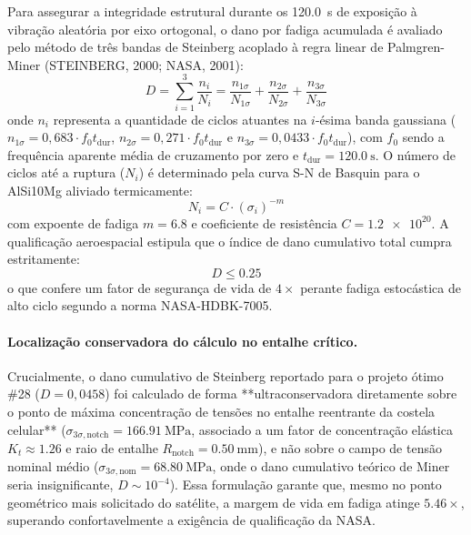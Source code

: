 Para assegurar a integridade estrutural durante os \SI{120.0}{\second} de exposição à vibração aleatória por eixo ortogonal, o dano por fadiga acumulada é avaliado pelo método de três bandas de Steinberg acoplado à regra linear de Palmgren-Miner (STEINBERG, 2000; NASA, 2001):
\begin{equation}
  D = \sum_{i=1}^{3} \frac{n_i}{N_i} = \frac{n_{1\sigma}}{N_{1\sigma}} + \frac{n_{2\sigma}}{N_{2\sigma}} + \frac{n_{3\sigma}}{N_{3\sigma}}
  \label{eq:miner}
\end{equation}
onde $n_i$ representa a quantidade de ciclos atuantes na $i$-ésima banda gaussiana ($n_{1\sigma} = 0{,}683 \cdot f_0 t_{\text{dur}}$, $n_{2\sigma} = 0{,}271 \cdot f_0 t_{\text{dur}}$ e $n_{3\sigma} = 0{,}0433 \cdot f_0 t_{\text{dur}}$), com $f_0$ sendo a frequência aparente média de cruzamento por zero e $t_{\text{dur}} = \SI{120.0}{\second}$. O número de ciclos até a ruptura ($N_i$) é determinado pela curva S-N de Basquin para o AlSi10Mg aliviado termicamente:
\begin{equation}
  N_i = C \cdot \left(\sigma_i\right)^{-m}
  \label{eq:basquin}
\end{equation}
com expoente de fadiga $m = \num{6.8}$ e coeficiente de resistência $C = \num{1.2e20}$. A qualificação aeroespacial estipula que o índice de dano cumulativo total cumpra estritamente:
\begin{equation}
  D \le \num{0.25}
  \label{eq:dmax}
\end{equation}
o que confere um fator de segurança de vida de $4\times$ perante fadiga estocástica de alto ciclo segundo a norma NASA-HDBK-7005.

\paragraph*{Localização conservadora do cálculo no entalhe crítico.}
Crucialmente, o dano cumulativo de Steinberg reportado para o projeto ótimo \#28 ($D = 0{,}0458$) foi calculado de forma **ultraconservadora diretamente sobre o ponto de máxima concentração de tensões no entalhe reentrante da costela celular** ($\sigma_{3\sigma,\text{notch}} = \SI{166.91}{\mega\pascal}$, associado a um fator de concentração elástica $K_t \approx \num{1.26}$ e raio de entalhe $R_{\text{notch}} = \SI{0.50}{\milli\metre}$), e não sobre o campo de tensão nominal médio ($\sigma_{3\sigma,\text{nom}} = \SI{68.80}{\mega\pascal}$, onde o dano cumulativo teórico de Miner seria insignificante, $D \sim 10^{-4}$). Essa formulação garante que, mesmo no ponto geométrico mais solicitado do satélite, a margem de vida em fadiga atinge $\num{5.46}\times$, superando confortavelmente a exigência de qualificação da NASA.

